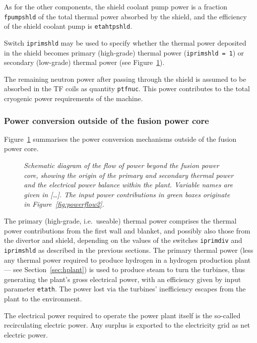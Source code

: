 \documentclass[11pt,a4paper]{report}
\begin{document}
As for the other components, the shield coolant pump power is a fraction
\texttt{fpumpshld} of the total thermal power absorbed by the shield, and
the efficiency of the shield coolant pump is \texttt{etahtpshld}.

Switch \texttt{iprimshld} may be used to specify whether the thermal power
deposited in the shield becomes primary (high-grade) thermal power
(\texttt{iprimshld = 1}) or secondary (low-grade) thermal power (see
Figure~\ref{fig:powerflow3}).

The remaining neutron power after passing through the shield is assumed to be
absorbed in the TF coils as quantity \texttt{ptfnuc}. This power contributes
to the total cryogenic power requirements of the machine.

\subsubsection{Power conversion outside of the fusion power core}

Figure~\ref{fig:powerflow3} summarises the power conversion mechanisms outside
of the fusion power core.

\begin{figure}[tbph]
\caption[Power flow outside the fusion power plant core]
{\label{fig:powerflow3} \textit{Schematic diagram of the flow of power beyond
    the fusion power core, showing the origin of the primary and secondary
    thermal power and the electrical power balance within the plant. Variable
    names are given in [\ldots]. The input power contributions in green boxes
    originate in Figure~\ref{fig:powerflow2}. }  }
\end{figure}

The primary (high-grade, i.e.\ useable) thermal power comprises the thermal
power contributions from the first wall and blanket, and possibly also those
from the divertor and shield, depending on the values of the switches
\texttt{iprimdiv} and \texttt{iprimshld} as described in the previous
sections. The primary thermal power (less any thermal power required to
produce hydrogen in a hydrogen production plant --- see
Section~\ref{sec:hplant}) is used to produce steam to turn the turbines, thus
generating the plant's gross electrical power, with an efficiency given by
input parameter \texttt{etath}. The power lost via the turbines' inefficiency
escapes from the plant to the environment.

The electrical power required to operate the power plant itself is the
so-called recirculating electric power. Any surplus is exported to the
electricity grid as net electric power.
\end{document}
